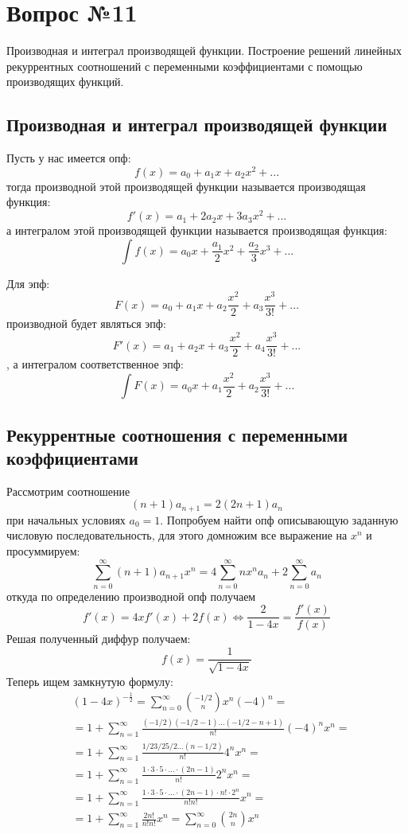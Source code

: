\chapter{Вопрос №11}

Производная и интеграл производящей функции. Построение решений линейных рекуррентных соотношений с переменными коэффициентами с помощью производящих функций.

\section{Производная и интеграл производящей функции}

Пусть у нас имеется опф: $$ f\left(x\right) = a_0 + a_1 x + a_2 x^2 + ... $$
тогда производной этой производящей функции называется производящая функция: $$ f'\left(x\right) = a_1 + 2a_2x + 3a_3x^2 + ... $$
а интегралом этой производящей функции называется производящая функция: $$ \int f\left(x\right) = a_0 x + \frac{a_1}{2} x^2 + \frac{a_2}{3} x^3 + ... $$

Для эпф: $$ F\left(x\right) = a_0 + a_1 x + a_2 \frac{x^2}{2} + a_3 \frac{x^3}{3!} + ... $$ производной будет являться эпф: $$ F'\left(x\right) = a_1 + a_2 x + a_3 \frac{x^2}{2} + a_4 \frac{x^3}{3!} + ... $$, а интегралом соответственное эпф: $$ \int F\left(x\right) = a_0 x + a_1 \frac{x^2}{2} + a_2\frac{x^3}{3!} + ... $$

\section{Рекуррентные соотношения с переменными коэффициентами}

Рассмотрим соотношение $$ \left(n+1\right) a_{n+1} = 2\left(2n+1\right) a_n$$ при начальных условиях $a_0 = 1$. Попробуем найти опф описывающую заданную числовую последовательность, для этого домножим все выражение на $x^n$ и просуммируем:
 $$ \sum_{n=0}^\infty \left(n+1\right) a_{n+1} x^n = 4 \sum_{n=0}^\infty n x^n a_n + 2\sum_{n=0}^\infty a_n $$
откуда по определению производной опф получаем $$ f'\left(x\right) = 4xf'\left(x\right) + 2f\left(x\right) \Leftrightarrow \frac{2}{1-4x} = \frac{f'\left(x\right)}{f\left(x\right)} $$
Решая полученный диффур получаем: $$ f\left(x\right) = \frac{1}{\sqrt{1-4x}}$$
Теперь ищем замкнутую формулу:
\[
	\begin{split}
		& \left(1-4x\right)^{-\frac{1}{2}} = \sum_{n=0}^{\infty} \binom{-1/2}{n}x^n\left(-4\right)^n = \\
		& = 1+ \sum_{n=1}^{\infty}\frac{\left(-1/2\right)\left(-1/2-1\right)...\left(-1/2-n+1\right)}{n!}\left(-4\right)^nx^n = \\
		& = 1+ \sum_{n=1}^{\infty} \frac{1/2 3/2 5/2 ... \left(n-1/2\right)}{n!} 4^n x^n = \\
		& = 1+ \sum_{n=1}^{\infty}\frac{1\cdot3\cdot5\cdot...\cdot\left(2n-1\right)}{n!} 2^n x^n = \\
		& = 1 + \sum_{n=1}^{\infty}\frac{1\cdot3\cdot5\cdot...\cdot\left(2n-1\right)\cdot n! \cdot 2^n}{n!n!}x^n = \\
		& = 1 + \sum_{n=1}^{\infty}\frac{2n!}{n!n!}x^n = \sum_{n=0}^{\infty} \binom{2n}{n}x^n
	\end{split}
\]

